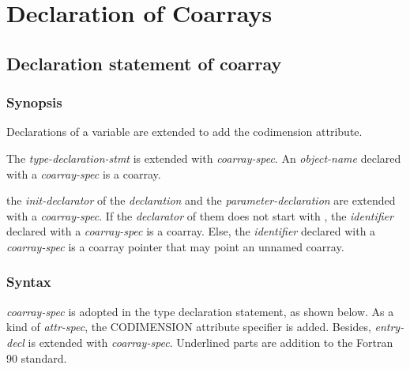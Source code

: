 \section{Declaration of Coarrays}
\label{sec:Declaration of Coarrays}

\subsection{Declaration statement of coarray}
\label{sec:Declaration statement of coarray}

\subsubsection*{Synopsis}
Declarations of a variable are extended to add the codimension attribute.

{\onlyF}
The {\it type-declaration-stmt} is extended with {\it coarray-spec}.
An {\it object-name} declared with a {\it coarray-spec} is a coarray.

{\onlyC} 
the {\it init-declarator} of the {\it declaration} and 
the {\it parameter-declaration} are extended with a {\it coarray-spec}.
If the {\it declarator} of them does not start with {\tt *},
the {\it identifier} declared with a {\it coarray-spec} is a coarray.
Else, 
the {\it identifier} declared with a {\it coarray-spec} is a coarray pointer
that may point an unnamed coarray.


\subsubsection*{Syntax \onlyF}
{\it coarray-spec} is adopted in the type declaration statement, as shown below.
As a kind of {\it attr-spec}, the CODIMENSION attribute specifier is added.
Besides, {\it entry-decl} is extended with {\it coarray-spec}.
Underlined parts are addition to the Fortran 90 standard.

